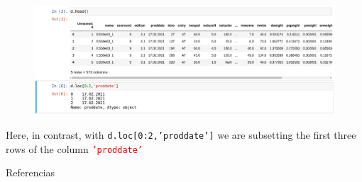 \documentclass[aspectratio=169]{beamer}
\begin{document}
\begin{frame}
\begin{figure}
\includegraphics[width=.75\textwidth]{indexing.png}
\end{figure}
Here, in contrast, with \texttt{d.loc[0:2,'proddate']} we are subsetting the first three rows of the column \texttt{\textcolor{red}{'proddate'}}
\end{frame}

\begin{frame}[allowframebreaks]{Referencias}
\tiny{ 


} 
\end{frame}

\pgfdeclareimage[height=0cm,width=0cm]{}{}
 \logo{\pgfuseimage{}}
\beamertemplatenavigationsymbolsempty
\begin{frame}
\end{frame}
\end{document}
